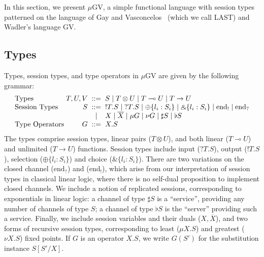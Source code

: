 \documentclass[orivec,envcountsame]{llncs}
\newcommand{\with}{\mathbin\binampersand}
\newcommand{\gvdual}[1]{\overline{#1}}
\newcommand{\gvout}[2]{{!#1.#2}}
\newcommand{\gvin}[2]{{?#1.#2}}
\newcommand{\lto}{\ensuremath{\multimap}}
\newcommand{\uto}{\ensuremath{\rightarrow}}
\newcommand{\outterm}{\mathrm{end}_!}
\newcommand{\interm}{\mathrm{end}_?}
\newcommand{\gvserver}[1]{\flat #1}
\newcommand{\gvservice}[1]{\sharp #1}
\newcommand{\mugv}{$\mu\mathrm{GV}$\xspace}
\begin{document}
In this section, we present \mugv, a simple functional language with session types patterned on the
language of Gay and Vasconcelos~\cite{GayVasconcelos10} (which we call LAST) and Wadler's language
GV.

\subsection{Types}
\label{sec:mugv-types}

Types, session types, and type operators in \mugv are given by the following grammar:
\[
\begin{array}{l@{\hspace{1mm}}r@{\hspace{2mm}}c@{\hspace{2mm}}l}
  \text{Types}         & T,U,V & ::= & S \mid T \otimes U \mid T \lto U \mid T \uto U \\
  \text{Session Types} & S     & ::= & \gvout{T}{S} \mid \gvin{T}{S}
                                \mid   \oplus \{ l_i : S_i \} \mid \with \{ l_i : S_i \}
                                \mid   \outterm \mid \interm \\
                            & & \mid & X \mid \gvdual{X}
                                \mid   \mu G \mid \nu G
                                \mid   \gvservice{S} \mid \gvserver{S} \\
  \text{Type Operators} & G    & ::= & X.S %
\end{array}
\]%
%
The types comprise session types, linear pairs ($T \otimes U$), and both linear ($T \lto U$) and
unlimited ($T \uto U$) functions.
%
Session types include input ($\gvin{T}{S}$), output ($\gvout{T}{S}$), selection ($\oplus\{ l_i:S_i
\}$) and choice ($\with\{l_i:S_i\}$). There are two variations on the closed channel ($\interm$) and
($\outterm$), which arise from our interpretation of session types in classical linear logic, where
there is no self-dual proposition to implement closed channels. We include a notion of replicated
sessions, corresponding to exponentials in linear logic: a channel of type $\gvservice{S}$ is a
``service'', providing any number of channels of type $S$; a channel of type $\gvserver{S}$ is the
``server'' providing such a service. Finally, we include session variables and their duals
($X,\gvdual{X}$), and two forms of recursive session types, corresponding to least ($\mu X.S$) and
greatest ($\nu X.S$) fixed points. If $G$ is an operator $X.S$, we write $G(S')$ for the
substitution instance $S[S'/X]$.
\end{document}

